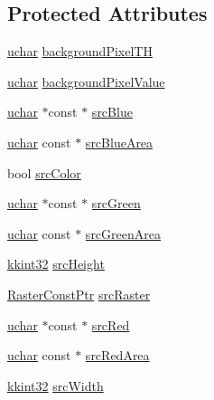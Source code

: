 \subsection*{Protected Attributes}
\begin{DoxyCompactItemize}
\item 
\hyperlink{namespace_k_k_b_ace9969169bf514f9ee6185186949cdf7}{uchar} \hyperlink{class_k_k_b_1_1_morph_op_a0f9e76c2f2c45f0563567c49cd69a43b}{background\+Pixel\+TH}
\item 
\hyperlink{namespace_k_k_b_ace9969169bf514f9ee6185186949cdf7}{uchar} \hyperlink{class_k_k_b_1_1_morph_op_a0c3862d1c8427c4d246e0bcd56699741}{background\+Pixel\+Value}
\item 
\hyperlink{namespace_k_k_b_ace9969169bf514f9ee6185186949cdf7}{uchar} $\ast$const $\ast$ \hyperlink{class_k_k_b_1_1_morph_op_ad11edf2de07634c4c68df9a2e74cfd6c}{src\+Blue}
\item 
\hyperlink{namespace_k_k_b_ace9969169bf514f9ee6185186949cdf7}{uchar} const $\ast$ \hyperlink{class_k_k_b_1_1_morph_op_a52fcf660b2173a2b6e8988ed23cf638c}{src\+Blue\+Area}
\item 
bool \hyperlink{class_k_k_b_1_1_morph_op_a0cecdeb8369c7ab2689fbd9f997472b0}{src\+Color}
\item 
\hyperlink{namespace_k_k_b_ace9969169bf514f9ee6185186949cdf7}{uchar} $\ast$const $\ast$ \hyperlink{class_k_k_b_1_1_morph_op_ab811c702f7e0c8ffccdd21111c8144ab}{src\+Green}
\item 
\hyperlink{namespace_k_k_b_ace9969169bf514f9ee6185186949cdf7}{uchar} const $\ast$ \hyperlink{class_k_k_b_1_1_morph_op_a1a3372b8645c297f21c5805707aef8a0}{src\+Green\+Area}
\item 
\hyperlink{namespace_k_k_b_a8fa4952cc84fda1de4bec1fbdd8d5b1b}{kkint32} \hyperlink{class_k_k_b_1_1_morph_op_a54b2ce1b398a80803b4dbe8aef956b51}{src\+Height}
\item 
\hyperlink{namespace_k_k_b_a5acfa7402dc4df1769f90d3dc8ddfc2c}{Raster\+Const\+Ptr} \hyperlink{class_k_k_b_1_1_morph_op_a9af0ebff0135d124c7d1d17e21c4d7e6}{src\+Raster}
\item 
\hyperlink{namespace_k_k_b_ace9969169bf514f9ee6185186949cdf7}{uchar} $\ast$const $\ast$ \hyperlink{class_k_k_b_1_1_morph_op_a4d790e4b71cfdaecee876879663dfdb4}{src\+Red}
\item 
\hyperlink{namespace_k_k_b_ace9969169bf514f9ee6185186949cdf7}{uchar} const $\ast$ \hyperlink{class_k_k_b_1_1_morph_op_acd1f255803231ecfabc0609685e56abe}{src\+Red\+Area}
\item 
\hyperlink{namespace_k_k_b_a8fa4952cc84fda1de4bec1fbdd8d5b1b}{kkint32} \hyperlink{class_k_k_b_1_1_morph_op_aec2cfb3015497e4077751fc5f19559ab}{src\+Width}
\end{DoxyCompactItemize}
